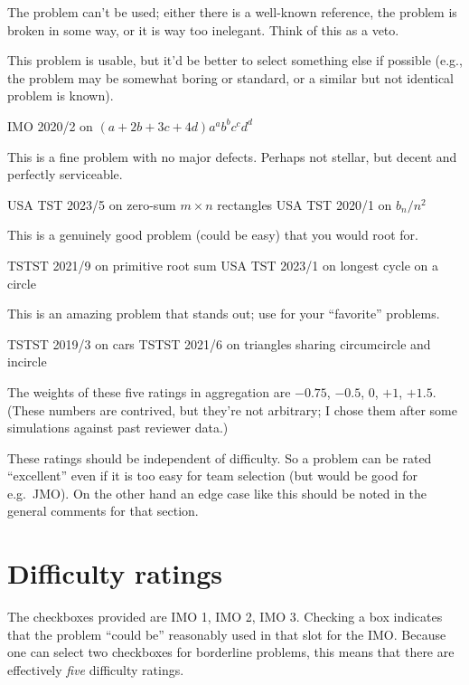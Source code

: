 \begin{description}
  \ii[Unsuitable] The problem can't be used;
  either there is a well-known reference,
  the problem is broken in some way,
  or it is way too inelegant.
  Think of this as a veto.

  \ii[Mediocre] This problem is usable,
  but it'd be better to select something else if possible
  (e.g., the problem may be somewhat boring or standard,
  or a similar but not identical problem is known).
  \begin{itemize}
    \ii IMO 2020/2 on $(a+2b+3c+4d)a^ab^bc^cd^d$
  \end{itemize}

  \ii[Acceptable] This is a fine problem with no major defects.
  Perhaps not stellar, but decent and perfectly serviceable.
  \begin{itemize}
    \ii USA TST 2023/5 on zero-sum $m\times n$ rectangles
    \ii USA TST 2020/1 on $b_n/n^2$
  \end{itemize}

  \ii[Nice] This is a genuinely good problem (could be easy)
  that you would root for.
  \begin{itemize}
    \ii TSTST 2021/9 on primitive root sum
    \ii USA TST 2023/1 on longest cycle on a circle
  \end{itemize}

  \ii[Excellent] This is an amazing problem that stands out;
  use for your ``favorite'' problems.
  \begin{itemize}
    \ii TSTST 2019/3 on cars
    \ii TSTST 2021/6 on triangles sharing circumcircle and incircle
  \end{itemize}
\end{description}
The weights of these five ratings in aggregation
are $-0.75$, $-0.5$, $0$, $+1$, $+1.5$.
(These numbers are contrived, but they're not arbitrary;
I chose them after some simulations against past reviewer data.)

These ratings should be independent of difficulty.
So a problem can be rated ``excellent''
even if it is too easy for team selection
(but would be good for e.g.\ JMO).
On the other hand an edge case like this
should be noted in the general comments for that section.

\section{Difficulty ratings}
The checkboxes provided are IMO 1, IMO 2, IMO 3.
Checking a box indicates that the problem ``could be''
reasonably used in that slot for the IMO.
Because one can select two checkboxes for borderline problems,
this means that there are effectively \emph{five} difficulty ratings.

